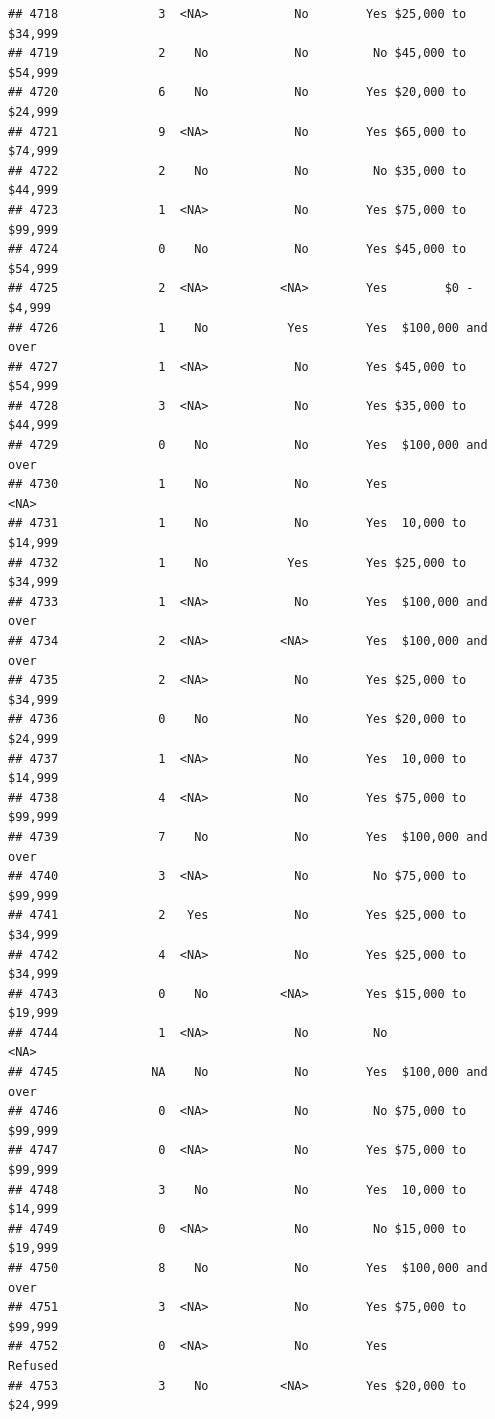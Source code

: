 \documentclass[man]{apa6}
\begin{document}
\begin{verbatim}
## 4718              3  <NA>            No        Yes $25,000 to $34,999
## 4719              2    No            No         No $45,000 to $54,999
## 4720              6    No            No        Yes $20,000 to $24,999
## 4721              9  <NA>            No        Yes $65,000 to $74,999
## 4722              2    No            No         No $35,000 to $44,999
## 4723              1  <NA>            No        Yes $75,000 to $99,999
## 4724              0    No            No        Yes $45,000 to $54,999
## 4725              2  <NA>          <NA>        Yes        $0 - $4,999
## 4726              1    No           Yes        Yes  $100,000 and over
## 4727              1  <NA>            No        Yes $45,000 to $54,999
## 4728              3  <NA>            No        Yes $35,000 to $44,999
## 4729              0    No            No        Yes  $100,000 and over
## 4730              1    No            No        Yes               <NA>
## 4731              1    No            No        Yes  10,000 to $14,999
## 4732              1    No           Yes        Yes $25,000 to $34,999
## 4733              1  <NA>            No        Yes  $100,000 and over
## 4734              2  <NA>          <NA>        Yes  $100,000 and over
## 4735              2  <NA>            No        Yes $25,000 to $34,999
## 4736              0    No            No        Yes $20,000 to $24,999
## 4737              1  <NA>            No        Yes  10,000 to $14,999
## 4738              4  <NA>            No        Yes $75,000 to $99,999
## 4739              7    No            No        Yes  $100,000 and over
## 4740              3  <NA>            No         No $75,000 to $99,999
## 4741              2   Yes            No        Yes $25,000 to $34,999
## 4742              4  <NA>            No        Yes $25,000 to $34,999
## 4743              0    No          <NA>        Yes $15,000 to $19,999
## 4744              1  <NA>            No         No               <NA>
## 4745             NA    No            No        Yes  $100,000 and over
## 4746              0  <NA>            No         No $75,000 to $99,999
## 4747              0  <NA>            No        Yes $75,000 to $99,999
## 4748              3    No            No        Yes  10,000 to $14,999
## 4749              0  <NA>            No         No $15,000 to $19,999
## 4750              8    No            No        Yes  $100,000 and over
## 4751              3  <NA>            No        Yes $75,000 to $99,999
## 4752              0  <NA>            No        Yes            Refused
## 4753              3    No          <NA>        Yes $20,000 to $24,999

\end{verbatim}
\end{document}

